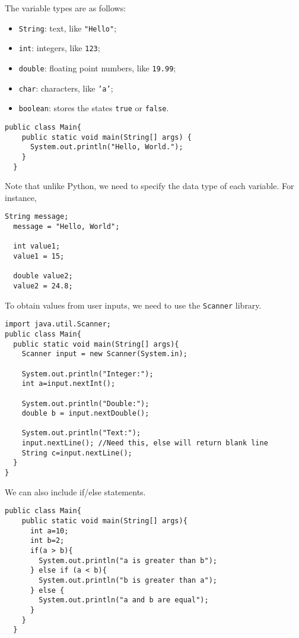 \documentclass[10pt]{mypackage}
\begin{document}
The variable types are as follows:
\begin{itemize}
  \item \texttt{String}: text, like \texttt{"Hello"};
  \item \texttt{int}: integers, like \texttt{123};
  \item \texttt{double}: floating point numbers, like \texttt{19.99};
  \item \texttt{char}: characters, like \texttt{'a'};
  \item \texttt{boolean}: stores the states \texttt{true} or \texttt{false}. 
\end{itemize}
\begin{lstlisting}[style=javastyle,title=Hello World]
  public class Main{
    public static void main(String[] args) {
      System.out.println("Hello, World.");
    }
  }
\end{lstlisting}
Note that unlike Python, we need to specify the data type of each variable. For instance,
\begin{lstlisting}[style=javastyle,title=Values to Variables]
  String message;
  message = "Hello, World";

  int value1;
  value1 = 15;

  double value2;
  value2 = 24.8;
\end{lstlisting}
To obtain values from user inputs, we need to use the \texttt{Scanner} library.
\begin{lstlisting}[style=javastyle,title=User Input]
import java.util.Scanner;
public class Main{
  public static void main(String[] args){
    Scanner input = new Scanner(System.in);

    System.out.println("Integer:");
    int a=input.nextInt();

    System.out.println("Double:");
    double b = input.nextDouble();

    System.out.println("Text:");
    input.nextLine(); //Need this, else will return blank line
    String c=input.nextLine();
  }
}
\end{lstlisting}
We can also include if/else statements.
\begin{lstlisting}[style=javastyle,title=Using If/Else Statements]
  public class Main{
    public static void main(String[] args){
      int a=10;
      int b=2;
      if(a > b){
        System.out.println("a is greater than b");
      } else if (a < b){
        System.out.println("b is greater than a");
      } else {
        System.out.println("a and b are equal");
      }
    }
  }
\end{lstlisting}
\end{document}
